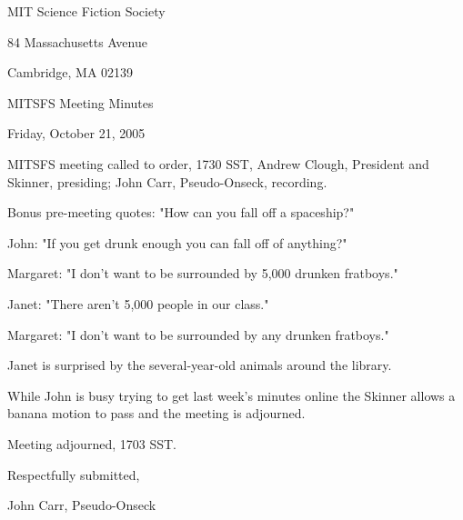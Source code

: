 \documentclass[10pt]{article}
\begin{document}
\begin{center}

MIT Science Fiction Society

84 Massachusetts Avenue

Cambridge, MA 02139

\vspace{12pt}

MITSFS Meeting Minutes

Friday, October 21, 2005

\end{center}

\vspace{18pt}

\setlength{\parskip}{6pt}

\noindent
MITSFS meeting called to order, 1730 SST, Andrew Clough, President and 
Skinner, presiding; John Carr, Pseudo-Onseck, recording.

Bonus pre-meeting quotes:
"How can you fall off a spaceship?"

John: "If you get drunk enough you can fall off of anything?"

Margaret: "I don't want to be surrounded by 5,000 drunken fratboys."

Janet: "There aren't 5,000 people in our class."

Margaret: "I don't want to be surrounded by any drunken fratboys."

Janet is surprised by the several-year-old animals around the library.

While John is busy trying to get last week's minutes online the
Skinner allows a banana motion to pass and the meeting is adjourned.

\vspace{12pt}

\noindent
Meeting adjourned, 1703 SST.

\vspace{18pt}

\centerline{Respectfully submitted,}
\centerline{John Carr, Pseudo-Onseck}
\end{document}
